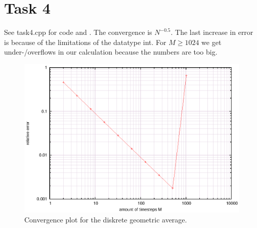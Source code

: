 \documentclass[]{article}
\begin{document}
\section*{Task 4} See task4.cpp for code and . The convergence
is $N^{-0.5}$. The last increase in error is because of the limitations of
the datatype int. For $M\ge 1024$ we get under-/overflows in our calculation
because the numbers are too big.
\begin{figure}[!ht]
\includegraphics[width=.9\textwidth]{task4.eps}
\caption{Convergence plot for the diskrete geometric average.}
\label{fig:Task4}
\end{figure}
\clearpage
\end{document}
